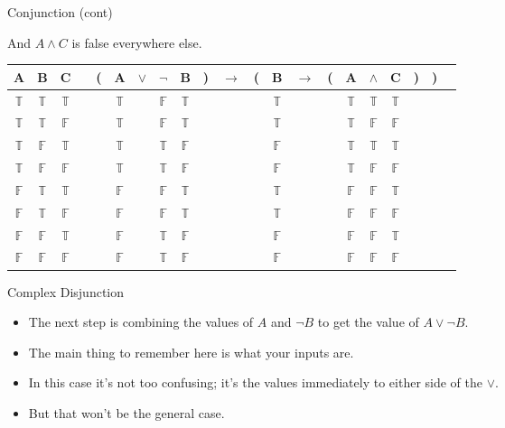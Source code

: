 \documentclass[
  ignorenonframetext,
]{beamer}
\providecommand{\tightlist}{%
  \setlength{\itemsep}{0pt}\setlength{\parskip}{0pt}}
\renewcommand{\,}{\text{, }}
\def\True{\mathbb{T}}
\def\False{\mathbb{F}}
\begin{document}
\begin{frame}{Conjunction (cont)}
\protect\hypertarget{conjunction-cont}{}

And \(A \wedge C\) is false everywhere else.

\begin{center}
\bigskip
\begin{tabular}{@{ }c@{ }@{ }c@{ }@{ }c | c@{ }@{}c@{}@{ }c@{ }@{ }c@{ }@{ }c@{ }@{ }c@{ }@{}c@{}@{ }c@{ }@{}c@{}@{ }c@{ }@{ }c@{ }@{}c@{}@{ }c@{ }@{ }c@{ }@{ }c@{ }@{}c@{}@{}c@{}@{ }c}
A & B & C &  & ( & A & $\vee$ & $\neg$ & B & ) & $\rightarrow$ & ( & B & $\rightarrow$ & ( & A & $\wedge$ & C & ) & ) & \\
\hline 
 $\True$ & $\True$ & $\True$ &  &  & $\True$ && $\False$ & $\True$ &  &&  & $\True$ &&  & $\True$ & $\True$ & $\True$ &  &  & \\
 $\True$ & $\True$ & $\False$ &  &  & $\True$ && $\False$ & $\True$ &  &&  & $\True$ &&  & $\True$ & $\False$ & $\False$ &  &  & \\
 $\True$ & $\False$ & $\True$ &  &  & $\True$ && $\True$ & $\False$ &  &&  & $\False$ &&  & $\True$ & $\True$ & $\True$ &  &  & \\
 $\True$ & $\False$ & $\False$ &  &  & $\True$ && $\True$ & $\False$ &  &&  & $\False$ &&  & $\True$ & $\False$ & $\False$ &  &  & \\
 $\False$ & $\True$ & $\True$ &  &  & $\False$ && $\False$ & $\True$ &  &&  & $\True$ &&  & $\False$ & $\False$ & $\True$ &  &  & \\
 $\False$ & $\True$ & $\False$ &  &  & $\False$ && $\False$ & $\True$ &  &&  & $\True$ &&  & $\False$ & $\False$ & $\False$ &  &  & \\
 $\False$ & $\False$ & $\True$ &  &  & $\False$ && $\True$ & $\False$ &  &&  & $\False$ &&  & $\False$ & $\False$ & $\True$ &  &  & \\
 $\False$ & $\False$ & $\False$ &  &  & $\False$ && $\True$ & $\False$ &  &&  & $\False$ &&  & $\False$ & $\False$ & $\False$ &  &  & \\
\end{tabular}
\bigskip
\end{center}

\end{frame}

\begin{frame}{Complex Disjunction}
\protect\hypertarget{complex-disjunction}{}

\begin{itemize}
\tightlist
\item
  The next step is combining the values of \(A\) and \(\neg B\) to get
  the value of \(A \vee \neg B\).
\item
  The main thing to remember here is what your inputs are.
\item
  In this case it's not too confusing; it's the values immediately to
  either side of the \(\vee\).
\item
  But that won't be the general case.
\end{itemize}

\end{frame}
\end{document}
